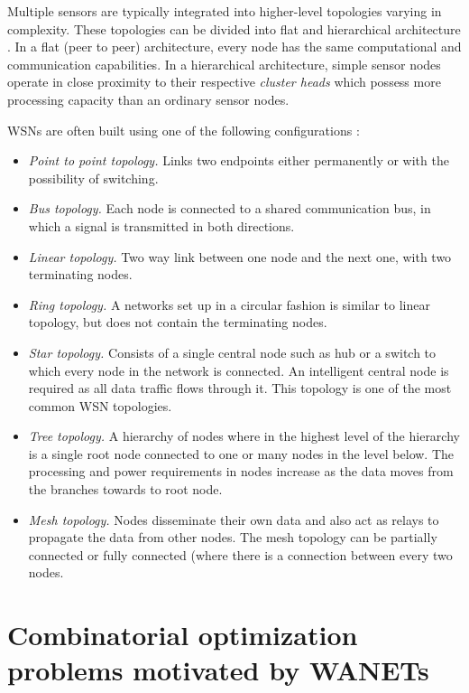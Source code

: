 Multiple sensors are typically integrated into higher-level topologies varying in complexity.
These topologies can be divided into flat and hierarchical architecture \cite{mcgrath13}.
In a flat (peer to peer) architecture, every node has the same computational and communication capabilities.
In a hierarchical architecture, simple sensor nodes operate in close proximity to their respective \emph{cluster heads} which possess more processing capacity than an ordinary sensor nodes.

WSNs are often built using one of the following configurations \cite{mcgrath13}:

\begin{itemize}
\item \emph{Point to point topology.} Links two endpoints either permanently or with the possibility of switching.
\item \emph{Bus topology.} Each node is connected to a shared communication bus, in which a signal is transmitted in both directions. 
\item \emph{Linear topology.} Two way link between one node and the next one, with two terminating nodes.
\item \emph{Ring topology.} A networks set up in a circular fashion is similar to linear topology, but does not contain the terminating nodes.
\item \emph{Star topology.} Consists of a single central node such as hub or a switch to which every node in the network is connected. 
An intelligent central node is required as all data traffic flows through it.
This topology is one of the most common WSN topologies.
\item \emph{Tree topology.} A hierarchy of nodes where in the highest level of the hierarchy is a single root node connected to one or many nodes in the level below.
The processing and power requirements in nodes increase as the data moves from the branches towards to root node.
\item \emph{Mesh topology.} Nodes disseminate their own data and also act as relays to propagate the data from other nodes.
The mesh topology can be partially connected  or fully connected (where there is a connection between every two nodes.
\end{itemize}

\section{Combinatorial optimization problems motivated by WANETs}

